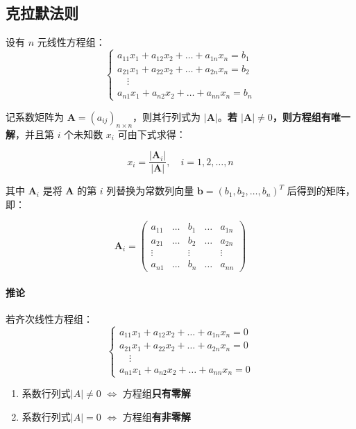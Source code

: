 \documentclass[./linear_algebra.tex]{subfiles}
\begin{document}
    \subsection{克拉默法则}

    设有 $n$ 元线性方程组：
    \[
        \begin{cases}
            a_{11}x_1 + a_{12}x_2 + \dots + a_{1n}x_n = b_1 \\
            a_{21}x_1 + a_{22}x_2 + \dots + a_{2n}x_n = b_2 \\
            \quad \vdots \\
            a_{n1}x_1 + a_{n2}x_2 + \dots + a_{nn}x_n = b_n
        \end{cases}
    \]

    记系数矩阵为 $\mathbf{A} = (a_{ij})_{n\times n}$，则其行列式为 $|\mathbf{A}|$。\textbf{若 $|\mathbf{A}| \neq 0$，则方程组有唯一解}，并且第 $i$ 个未知数 $x_i$ 可由下式求得：

    \[
        x_i = \frac{|\mathbf{A}_i|}{|\mathbf{A}|}, \quad i=1,2,\dots,n
    \]

    其中 $\mathbf{A}_i$ 是将 $\mathbf{A}$ 的第 $i$ 列替换为常数列向量 $\mathbf{b} = (b_1, b_2, \dots, b_n)^T$ 后得到的矩阵，即：

    \[
        \mathbf{A}_i =
        \begin{pmatrix}
            a_{11} & \dots & b_1    & \dots & a_{1n} \\
            a_{21} & \dots & b_2    & \dots & a_{2n} \\
            \vdots &       & \vdots &       & \vdots \\
            a_{n1} & \dots & b_n    & \dots & a_{nn}
        \end{pmatrix}
    \]

    \paragraph{推论} 若齐次线性方程组：
    \[
        \begin{cases}
            a_{11}x_1 + a_{12}x_2 + \dots + a_{1n}x_n = 0 \\
            a_{21}x_1 + a_{22}x_2 + \dots + a_{2n}x_n = 0 \\
            \quad \vdots \\
            a_{n1}x_1 + a_{n2}x_2 + \dots + a_{nn}x_n = 0
        \end{cases}
    \]

    \begin{enumerate}
        \item 系数行列式$|A| \neq 0$ $\Leftrightarrow$ 方程组\textbf{只有零解}
        \item 系数行列式$|A| = 0$ $\Leftrightarrow$ 方程组\textbf{有非零解}
    \end{enumerate}
\end{document}
